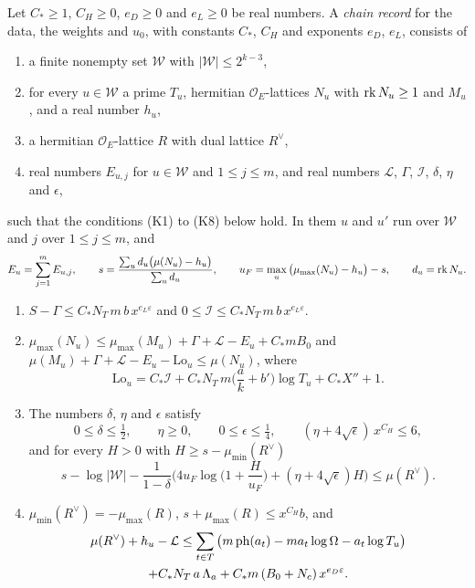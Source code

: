 \begin{definition}\label{r6:R6:def:record}
Let $C_\ast\ge1$, $C_H\ge0$, $e_D\ge0$ and $e_L\ge0$ be real numbers. A \emph{chain record} for the data, the weights and $u_0$, with constants $C_\ast$, $C_H$ and exponents $e_D$, $e_L$, consists of
\begin{enumerate}
\item[(a)] a finite nonempty set $\mathcal W$ with $\lvert\mathcal W\rvert\le2^{k-3}$,
\item[(b)] for every $u\in\mathcal W$ a prime $T_u$, hermitian $\mathcal O_E$-lattices $N_u$ with $\operatorname{rk} N_u\ge1$ and $M_u$, and a real number $h_u$,
\item[(c)] a hermitian $\mathcal O_E$-lattice $R$ with dual lattice $R^\vee$,
\item[(d)] real numbers $E_{u,j}$ for $u\in\mathcal W$ and $1\le j\le m$, and real numbers $\mathcal L$, $\Gamma$, $\mathcal I$, $\delta$, $\eta$ and $\epsilon$,
\end{enumerate}
such that the conditions (K1) to (K8) below hold. In them $u$ and $u'$ run over $\mathcal W$ and $j$ over $1\le j\le m$, and
\[
E_u=\sum_{j=1}^mE_{u,j},\qquad s=\frac{\sum_ud_u\big(\mu(N_u)-h_u\big)}{\sum_ud_u},\qquad u_F=\max_u\big(\mu_{\max}(N_u)-h_u\big)-s,\qquad d_u=\operatorname{rk} N_u .
\]
\begin{enumerate}
\item[(K1)] $S-\Gamma\le C_\ast N_T\,m\,b\,x^{e_L\varepsilon}$ and $0\le\mathcal I\le C_\ast N_T\,m\,b\,x^{e_L\varepsilon}$.
\item[(K2)] $\mu_{\max}(N_u)\le\mu_{\max}(M_u)+\Gamma+\mathcal L-E_u+C_\ast m B_0$ and $\mu(M_u)+\Gamma+\mathcal L-E_u-\mathrm{Lo}_u\le\mu(N_u)$, where
\[
\mathrm{Lo}_u=C_\ast\mathcal I+C_\ast N_T\,m\Big(\frac ak+b'\Big)\log T_u+C_\ast X''+1 .
\]
\item[(K3)] The numbers $\delta$, $\eta$ and $\epsilon$ satisfy
\[
0\le\delta\le\tfrac12,\qquad\eta\ge0,\qquad0\le\epsilon\le\tfrac14,\qquad(\eta+4\sqrt\epsilon)\,x^{C_H}\le6,
\]
and for every $H>0$ with $H\ge s-\mu_{\min}(R^\vee)$
\[
s-\log\lvert\mathcal W\rvert-\frac1{1-\delta}\Big(4u_F\log\Big(1+\frac H{u_F}\Big)+(\eta+4\sqrt\epsilon)H\Big)\le\mu(R^\vee).
\]
\item[(K4)] $\mu_{\min}(R^\vee)=-\mu_{\max}(R)$, $s+\mu_{\max}(R)\le x^{C_H}b$, and
\begin{multline*}
\mu(R^\vee)+h_u-\mathcal L\le\sum_{t\in T}\big(m\ph(a_t)-ma_t\log\Omega-a_t\log T_u\big)\\
+C_\ast N_T\,a\,\Lambda_a+C_\ast m\,(B_0+N_c)\,x^{e_D\varepsilon}.

\end{multline*}
\end{enumerate}
\end{definition}
